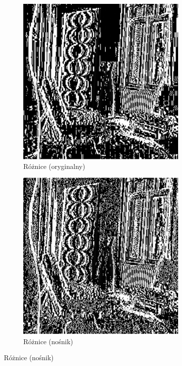 \documentclass[a4paper,12pt]{article}
\begin{document}
\begin{figure}[h]
\begin{subfigure}{0.3\textwidth}
                \includegraphics[width=\textwidth]{img/diff_cover.png}
                \caption{Różnice (oryginalny)}
            \end{subfigure}
            \hfill
            \begin{subfigure}{0.3\textwidth}
                \centering
                \includegraphics[width=\textwidth]{img/diff_stego.png}
                \caption{Różnice (nośnik)}
            \end{subfigure}
        

\end{figure}
\end{document}
